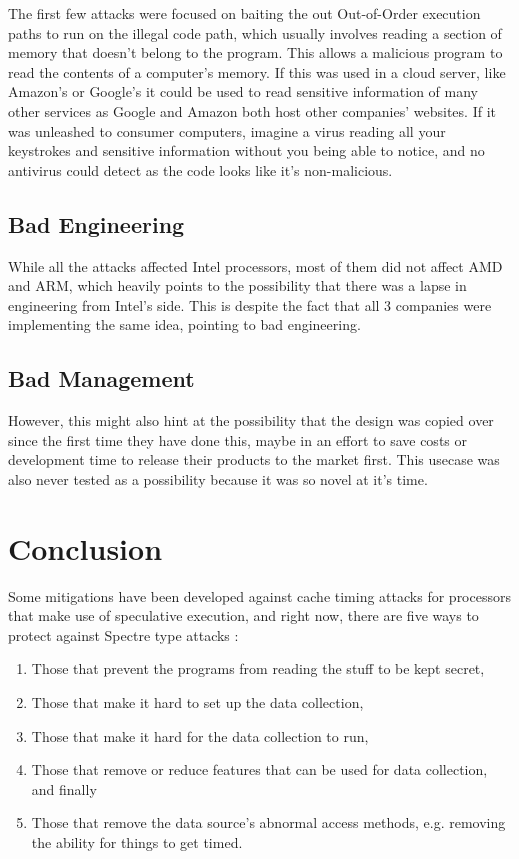 \documentclass[12pt]{article}
\begin{document}
The first few attacks were focused on baiting the out Out-of-Order execution paths to run on the illegal code path, which usually involves reading a section of memory that doesn't belong to the program. This allows a malicious program to read the contents of a computer's memory. If this was used in a cloud server, like Amazon's or Google's it could be used to read sensitive information of many other services as Google and Amazon both host other companies' websites. If it was unleashed to consumer computers, imagine a virus reading all your keystrokes and sensitive information without you being able to notice, and no antivirus could detect as the code looks like it's non-malicious.

\subsection*{Bad Engineering}

While all the attacks affected Intel processors, most of them did not affect AMD and ARM, which heavily points to the possibility that there was a lapse in engineering from Intel's side. This is despite the fact that all 3 companies were implementing the same idea, pointing to bad engineering.

\subsection*{Bad Management}

However, this might also hint at the possibility that the design was copied over since the first time they have done this, maybe in an effort to save costs or development time to release their products to the market first. This usecase was also never tested as a possibility because it was so novel at it's time.

\section*{Conclusion}

Some mitigations have been developed against cache timing attacks for processors that make use of speculative execution, and right now, there are five ways to protect against Spectre type attacks \cite[Sec.~2C]{Paper:DAWG}:
\begin{enumerate}
    \item Those that prevent the programs from reading the stuff to be kept secret,
    \item Those that make it hard to set up the data collection,
    \item Those that make it hard for the data collection to run,
    \item Those that remove or reduce features that can be used for data collection, and finally
    \item Those that remove the data source’s abnormal access methods, e.g. removing the ability for things to get timed.
\end{enumerate}
\end{document}

